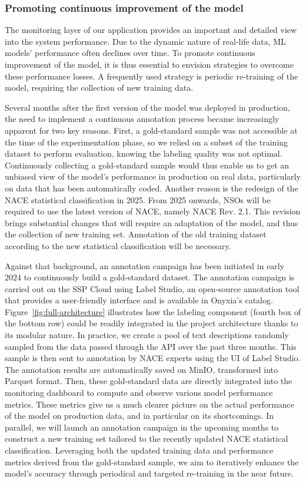 \documentclass[graybox]{svmult}
\begin{document}
\subsubsection{Promoting continuous improvement of the model}
\label{subsubsec:annotation}

The monitoring layer of our application provides an important and detailed view into the system performance. Due to the dynamic nature of real-life data, ML models' performance often declines over time. To promote continuous improvement of the model, it is thus essential to envision strategies to overcome these performance losses. A frequently used strategy is periodic re-training of the model, requiring the collection of new training data.

Several months after the first version of the model was deployed in production, the need to implement a continuous annotation process became increasingly apparent for two key reasons. First, a gold-standard sample was not accessible at the time of the experimentation phase, so we relied on a subset of the training dataset to perform evaluation, knowing the labeling quality was not optimal. Continuously collecting a gold-standard sample would thus enable us to get an unbiased view of the model's performance in production on real data, particularly on data that has been automatically coded. Another reason is the redesign of the NACE statistical classification in 2025. From 2025 onwards, NSOs will be required to use the latest version of NACE, namely NACE Rev. 2.1. This revision brings substantial changes that will require an adaptation of the model, and thus the collection of new training set. Annotation of the old training dataset according to the new statistical classification will be necessary.

Against that background, an annotation campaign has been initiated in early 2024 to continuously build a gold-standard dataset. The annotation campaign is carried out on the SSP Cloud using Label Studio, an open-source annotation tool that provides a user-friendly interface and is available in Onyxia's catalog. Figure~\ref{fig:full-architecture} illustrates how the labeling component (fourth box of the bottom row) could be readily integrated in the project architecture thanks to its modular nature. In practice, we create a pool of text descriptions randomly sampled from the data passed through the API over the past three months. This sample is then sent to annotation by NACE experts using the UI of Label Studio. The annotation results are automatically saved on MinIO, transformed into Parquet format. Then, these gold-standard data are directly integrated into the monitoring dashboard to compute and observe various model performance metrics. These metrics give us a much clearer picture on the actual performance of the model on production data, and in particular on its shortcomings. In parallel, we will launch an annotation campaign in the upcoming months to construct a new training set tailored to the recently updated NACE statistical classification. Leveraging both the updated training data and performance metrics derived from the gold-standard sample, we aim to iteratively enhance the model's accuracy through periodical and targeted re-training in the near future.
\end{document}
